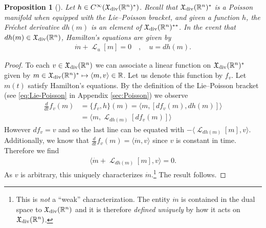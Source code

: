\documentclass[12pt]{amsart}
\newcommand{\R}{\ensuremath{\mathbb{R}}}
\newtheorem{prop}[thm]{Proposition}
\DeclareMathOperator{\lie}{\mathcal{L}}
\begin{document}
  \begin{prop}[\cite{Arnold1966}] \label{prop:LPDiff}
  Let $h \in C^{\infty}( \mathfrak{X}_{\rm div}(\R^n)^* )$.
  Recall that $\mathfrak{X}_{\rm div}(\R^n)^*$ is a Poisson manifold
  when equipped with the Lie--Poisson bracket,
  and given a function $h$, the Fr\'echet derivative $dh(m)$ is an element  of $\mathfrak{X}_{\rm div}(\R^n)^{**}$.
  In the event that $dh(m) \in \mathfrak{X}_{\rm div}(\R^n)$,
  Hamilton's equations are given by
  \begin{align}
    \dot{m} + \lie_u [m] = 0 \quad , \quad u = dh(m) \label{eq:LP}.
  \end{align}
\end{prop}
\begin{proof}
  To each $v \in \mathfrak{X}_{\rm div}(\R^n)$
  we can associate a linear function on $\mathfrak{X}_{\rm div}(\R^n)^*$
  given by $m \in \mathfrak{X}_{\rm div}(\R^n)^* \mapsto \langle m , v \rangle \in \R$.
  Let us denote this function by $f_v$.
  Let $m(t)$ satisfy Hamilton's equations.
  By the definition of the Lie--Poisson bracket
  (see \eqref{eq:Lie-Poisson} in Appendix \ref{sec:Poisson})
  we observe
  \begin{align*}
    \frac{d}{dt} f_v(m) &= \{ f_v , h \}(m) = \langle m , [ df_v(m) , dh(m) ] \rangle \\
    &= \langle m , \lie_{dh(m)}[ df_v(m) ] \rangle
  \end{align*}
  However $df_v = v$ and so
  the last line can be equated with  $-\langle \lie_{dh(m)}[m] , v \rangle$.
  Additionally, we know that $\frac{d}{dt} f_v(m) = \langle \dot{m} , v \rangle$ since $v$ is constant in time.
  Therefore we find
  \begin{align*}
    \langle \dot{m} + \lie_{dh(m)} [m] , v \rangle = 0.  
  \end{align*}
  As $v$ is arbitrary, this uniquely characterizes $\dot{m}$.\footnote{This is \emph{not} a ``weak'' characterization.  The entity $\dot{m}$ is
  contained in the dual space to $\mathfrak{X}_{\rm div}(\R^n)$ and it is
  therefore \emph{defined uniquely} by how it acts on $\mathfrak{X}_{\rm div}(\R^n)$.}
  The result follows.
\end{proof}
\end{document}
